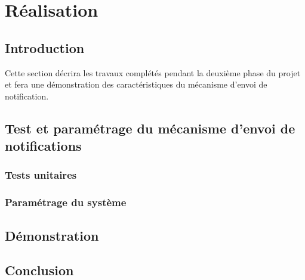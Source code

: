 \section{Réalisation}
\subsection{Introduction}
Cette section décrira les travaux complétés pendant la deuxième phase du projet et fera une démonstration des caractéristiques du mécanisme d'envoi de notification.
\subsection{Test et paramétrage du mécanisme d'envoi de notifications}
\subsubsection{Tests unitaires}
\subsubsection{Paramétrage du système}
\subsection{Démonstration}
\subsection{Conclusion}